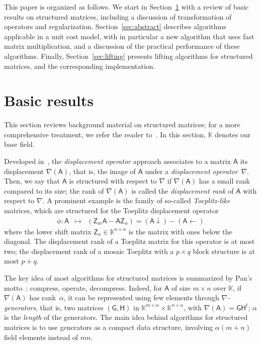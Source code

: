 \documentclass{sig-alternate}
\newcommand{\mA}{\ensuremath{\mathsf{A}}}
\newcommand{\mG}{\ensuremath{\mathsf{G}}}
\newcommand{\mH}{\ensuremath{\mathsf{H}}}
\newcommand{\mZ}{\ensuremath{\mathsf{Z}}}
\newcommand{\K}{\ensuremath{\mathbb{K}}}
\begin{document}
This paper is organized as follows. We start in
Section~\ref{sec:basics} with a review of basic results on structured
matrices, including a discussion of transformation of operators and
regularization. Section~\ref{sec:abstract} describes algorithms
applicable in a unit cost model, with in particular a new algorithm
that uses fast matrix multiplication, and a discussion of the
practical performance of these algorithms. Finally,
Section~\ref{sec:lifting} presents lifting algorithms for structured
matrices, and the corresponding implementation.


\section{Basic results}\label{sec:basics}

This section reviews background material on structured matrices; for a
more comprehensive treatment, we refer the reader to~\cite{Pan01}.
In this section, $\K$ denotes our base field.

\smallskip{}  Developed
in~\cite{KaKuMo79}, the {\it displacement operator} approach
associates to a matrix $\mA$ its displacement $\nabla(\mA)$, that is, the
image of $\mA$ under a \textit{displacement operator}~$\nabla$.  Then,
we say that $\mA$ is structured with respect to $\nabla$ if $\nabla(\mA)$
has a small rank compared to its size; the rank of $\nabla(\mA)$ is
called the \textit{displacement rank} of $\mA$ with respect to
$\nabla$. A prominent example is the family of so-called {\em
  Toeplitz-like} matrices, which are structured for the Toeplitz
displacement operator
\begin{eqnarray*}
  \phi: \mA & \mapsto & \left( \mZ_m \mA - \mA \mZ_n \right) = 
                        (\mA \downarrow) - (\mA \leftarrow)
\end{eqnarray*}
where the lower shift matrix $\mZ_n \in \K^{n \times n}$ is the matrix
with ones below the diagonal.  The displacement rank of a Toeplitz
matrix for this operator is at most two; the displacement rank of a
mosaic Toeplitz with a $p \times q$ block structure is at most $p+q$.

The key idea of most algorithms for structured matrices is summarized
by Pan's motto~\cite{Pan01}: compress, operate, decompress. Indeed,
for $\mA$ of size $m \times n$ over $\K$, if $\nabla(\mA)$ has
rank~$\alpha$, it can be represented using few elements through {\it
  $\nabla$-generators}, that is, two matrices $(\mG,\mH)$ in
$\K^{m\times \alpha} \times \K^{n\times \alpha}$, with $\nabla(\mA) =
\mG \mH^t$; $\alpha$ is the {\em length} of the generators. The main
idea behind algorithms for structured matrices is to use generators as
a compact data structure, involving $\alpha (m+n)$ field elements
instead of $mn$.
\end{document}
